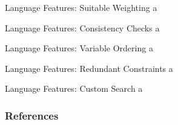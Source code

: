 \documentclass[handout,10pt,xcolor={dvipsnames},fleqn]{beamer}
\begin{document}
\begin{frame}{Language Features: Suitable Weighting}
a
\end{frame}

\begin{frame}{Language Features: Consistency Checks}
a
\end{frame}

\begin{frame}{Language Features: Variable Ordering}
a
\end{frame}

\begin{frame}{Language Features: Redundant Constraints}
a
\end{frame}

\begin{frame}{Language Features: Custom Search}
a
\end{frame}


\begin{frame}[allowframebreaks]
        \frametitle{References}
        
        
\end{frame}
\end{document}
